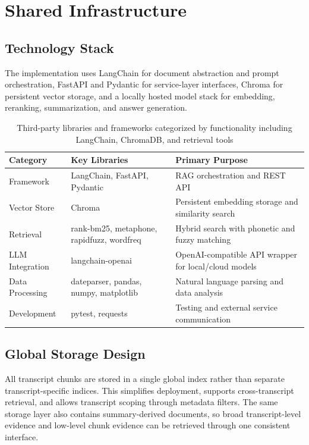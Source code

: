 \section{Shared Infrastructure}
\subsection{Technology Stack}
The implementation uses LangChain for document abstraction and prompt orchestration, FastAPI and Pydantic for service-layer interfaces, Chroma for persistent vector storage, and a locally hosted model stack for embedding, reranking, summarization, and answer generation.\cite{langchain_document,langchain_prompts,langchain_output_parsers,fastapi_docs,pydantic_docs,jina_embeddings_v3,bge_reranker_v2_m3,qwen3_14b_base,llama_cpp_server}

\begin{table}[H]
  \centering
  \begin{tabular}{|l|>{\raggedright\arraybackslash}p{}|>{\raggedright\arraybackslash}p{}|}
    \hline
    \textbf{Category} & \textbf{Key Libraries} & \textbf{Primary Purpose} \\
    \hline
    Framework & LangChain, FastAPI, Pydantic & RAG orchestration and REST API \\
    \hline
    Vector Store & Chroma & Persistent embedding storage and similarity search \\
    \hline
    Retrieval & rank-bm25, metaphone, rapidfuzz, wordfreq & Hybrid search with phonetic and fuzzy matching \\
    \hline
    LLM Integration & langchain-openai & OpenAI-compatible API wrapper for local/cloud models \\
    \hline
    Data Processing & dateparser, pandas, numpy, matplotlib & Natural language parsing and data analysis \\
    \hline
    Development & pytest, requests & Testing and external service communication \\
    \hline
  \end{tabular}
  \caption{Third-party libraries and frameworks categorized by functionality including LangChain, ChromaDB, and retrieval tools}
  \label{tab:third-party-libraries}
\end{table}

\subsection{Global Storage Design}
All transcript chunks are stored in a single global index rather than separate transcript-specific indices. This simplifies deployment, supports cross-transcript retrieval, and allows transcript scoping through metadata filters. The same storage layer also contains summary-derived documents, so broad transcript-level evidence and low-level chunk evidence can be retrieved through one consistent interface.\cite{langchain_chroma,chroma_persistence_sqlite}

